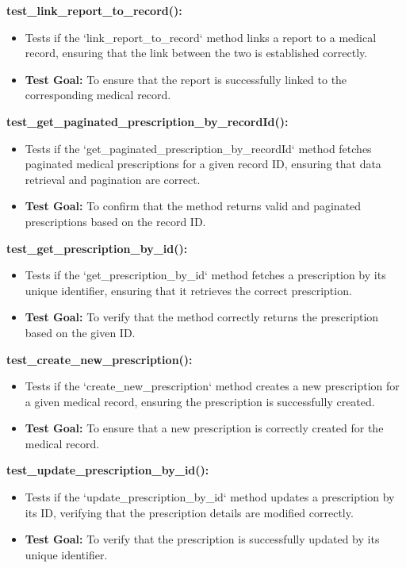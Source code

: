 \documentclass[12pt, titlepage]{article}
\begin{document}
\begin{enumerate}
\begin{enumerate}
\begin{enumerate}
\begin{enumerate}
\textbf{test\_link\_report\_to\_record():}  
\begin{itemize}
    \item Tests if the `link\_report\_to\_record` method links a report to a medical record, ensuring that the link between the two is established correctly.
    \item \textbf{Test Goal:} To ensure that the report is successfully linked to the corresponding medical record.
    \newline
\end{itemize}

\textbf{test\_get\_paginated\_prescription\_by\_recordId():}  
\begin{itemize}
    \item Tests if the `get\_paginated\_prescription\_by\_recordId` method fetches paginated medical prescriptions for a given record ID, ensuring that data retrieval and pagination are correct.
    \item \textbf{Test Goal:} To confirm that the method returns valid and paginated prescriptions based on the record ID.
    \newline
\end{itemize}

\textbf{test\_get\_prescription\_by\_id():}  
\begin{itemize}
    \item Tests if the `get\_prescription\_by\_id` method fetches a prescription by its unique identifier, ensuring that it retrieves the correct prescription.
    \item \textbf{Test Goal:} To verify that the method correctly returns the prescription based on the given ID.
    \newline
\end{itemize}

\textbf{test\_create\_new\_prescription():}  
\begin{itemize}
    \item Tests if the `create\_new\_prescription` method creates a new prescription for a given medical record, ensuring the prescription is successfully created.
    \item \textbf{Test Goal:} To ensure that a new prescription is correctly created for the medical record.
    \newline
\end{itemize}

\textbf{test\_update\_prescription\_by\_id():}  
\begin{itemize}
    \item Tests if the `update\_prescription\_by\_id` method updates a prescription by its ID, verifying that the prescription details are modified correctly.
    \item \textbf{Test Goal:} To verify that the prescription is successfully updated by its unique identifier.
    \newline
\end{itemize}








\end{enumerate}
\end{enumerate}
\end{enumerate}
\end{enumerate}
\end{document}

